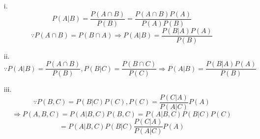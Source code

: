 	\begin{itemize}  
	\item[i.]
	\begin{equation*}
		P(A|B)=\frac{P(A \cap B)}{P(B)} = \frac{P(A \cap B)P(A)}{P(A)P(B)} 
	\end{equation*}	
	\begin{equation*}
		\because P(A \cap B) = P(B \cap A) \Rightarrow P(A|B) = \frac{P(B|A)P(A)}{P(B)}
	\end{equation*}
	\item[ii.]
	\begin{equation*}
		\because P(A|B) = \frac{P(A \cap B)}{P(B)}, P(B|C) = \frac{P(B\cap C)}{P(C)} \Rightarrow P(A|B) = \frac{P(B|A)P(A)}{P(B)}
	\end{equation*}
	\item[iii.]
	\begin{equation*}
		\because P(B,C) = P(B|C)P(C), P(C) = \frac{P(C|A)}{P(A|C)}P(A)
	\end{equation*}
	\begin{equation*}
		\Rightarrow P(A,B,C) = P(A|B,C)P(B,C) = P(A|B,C)P(B|C)P(C) 
	\end{equation*}
	\begin{equation*}
		= P(A|B,C)P(B|C)\frac{P(C|A)}{P(A|C)}P(A)
	\end{equation*}
\end{itemize}

